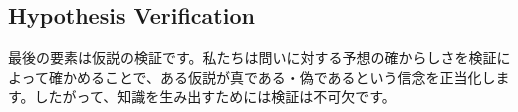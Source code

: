 





\subsection{Hypothesis Verification}
最後の要素は仮説の検証です。私たちは問いに対する予想の確からしさを検証によって確かめることで、ある仮説が真である・偽であるという信念を正当化します。したがって、知識を生み出すためには検証は不可欠です。

